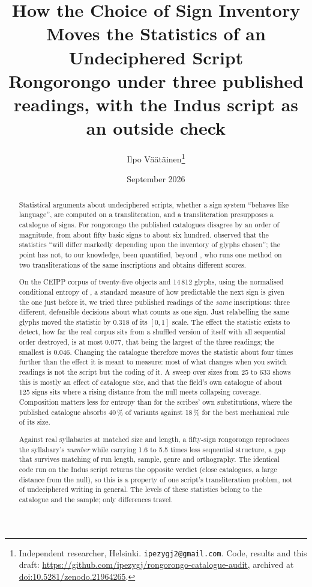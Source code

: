 \documentclass[11pt,a4paper]{article}
\title{How the Choice of Sign Inventory Moves the Statistics of an Undeciphered Script\\
\large Rongorongo under three published readings, with the Indus script as an outside check}
\author{Ilpo V\"a\"at\"ainen\thanks{Independent researcher, Helsinki. \texttt{ipezygj2@gmail.com}. Code, results and this draft: \url{https://github.com/ipezygj/rongorongo-catalogue-audit}, archived at \href{https://doi.org/10.5281/zenodo.21964265}{doi:10.5281/zenodo.21964265}.}}
\date{September 2026}
\begin{document}
\maketitle




\begin{abstract}
Statistical arguments about undeciphered scripts, whether a sign system ``behaves like language'', are computed on a transliteration, and a transliteration presupposes a catalogue of signs. For rongorongo the published catalogues disagree by an order of magnitude, from about fifty basic signs to about six hundred. \citet{pozdniakov2007} observed that the statistics ``will differ markedly depending upon the inventory of glyphs chosen''; the point has not, to our knowledge, been quantified, beyond \citet{korovina2026}, who
runs one method on two transliterations of the same inscriptions and obtains different
scores.

On the CEIPP corpus of twenty-five objects and 14\,812 glyphs, using the normalised conditional entropy of \citet{rao2010reply}, a standard measure of how predictable the next sign is given the one just before it, we tried three published readings of the \emph{same} inscriptions: three different, defensible decisions about what counts as one sign. Just relabelling the same glyphs moved the statistic by 0.318 of its $[0,1]$ scale. The effect the statistic exists to detect, how far the real corpus sits from a shuffled version of itself with all sequential order destroyed, is at most 0.077, that being the largest of the three readings; the smallest is 0.046. Changing the catalogue therefore moves the statistic about four times further than the effect it is meant to measure: most of what changes when you switch readings is not the script but the coding of it. A sweep over sizes from 25 to 633 shows this is mostly an effect of catalogue \emph{size}, and that the field's own catalogue of about 125 signs sits where a rising distance from the null meets collapsing coverage. Composition matters less for entropy than for the scribes' own substitutions, where the published catalogue absorbs 40\,\% of variants against 18\,\% for the best mechanical rule of its size.

Against real syllabaries at matched size and length, a fifty-sign rongorongo reproduces the syllabary's \emph{number} while carrying 1.6 to 5.5 times less sequential structure, a gap that survives matching of run length, sample, genre and orthography. The identical code run on the Indus script returns the opposite verdict (close catalogues, a large distance from the null), so this is a property of one script's transliteration problem, not of undeciphered writing in general. The levels of these statistics belong to the catalogue and the sample; only differences travel.
\end{abstract}
\end{document}

